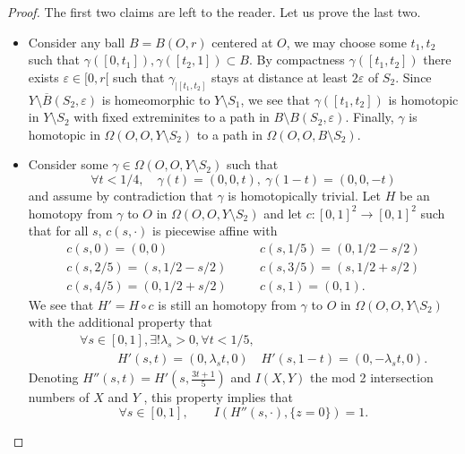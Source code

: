 \begin{proof}
The first two claims are left to the reader. Let us prove the last two.
 \begin{itemize}
\item 
 Consider any ball $B=B(O,r)$ centered at $O$, we may choose some $t_1,t_2$ such that $\gamma([0,t_1]),\gamma([t_2,1])  \subset B$. By compactness $\gamma([t_1,t_2])$ there exists  $\varepsilon\in [0,r[$ such that $\gamma_{|[t_1,t_2]}$ stays  at distance at least $2\varepsilon$ of $S_2$.  Since $Y\setminus \overline{B}(S_2,\varepsilon)$ is homeomorphic to $Y\setminus S_1$, we see that $\gamma([t_1,t_2])$ is homotopic in $Y\setminus S_2$ with fixed extreminites to a path in $B\setminus B(S_2,\varepsilon)$. Finally, $\gamma$ is homotopic in $\Omega(O,O,Y\setminus S_2)$ to a path  in $\Omega(O,O,B\setminus S_2)$. 

 \item Consider some $\gamma \in \Omega(O,O,Y\setminus S_2)$ such that
 $$\forall t< 1/4,\quad  \gamma(t) = (0,0,t),~ \gamma(1-t) = (0,0,-t) $$
 and assume by contradiction that $\gamma$ is homotopically trivial.   
  Let $H$ be an homotopy from $\gamma$ to $O$ in $\Omega(O,O,Y\setminus S_2)$ and let $c : [0,1]^2 \rightarrow [0,1]^2$ such that for all $s$, $c(s,\cdot)$ is piecewise affine with 
 \begin{eqnarray*}
c(s,0)=  (0,0)  &\quad&
c(s,1/5)=  (0,1/2-s/2)  \\
c(s,2/5)=  (s,1/2-s/2)  &\quad&
c(s,3/5)=  (s,1/2+s/2)  \\
c(s,4/5)=  (0,1/2+s/2 )  &\quad&
c(s,1)=  (0,1).  
\end{eqnarray*}
We see that $H'=H\circ c$ is still an homotopy from $\gamma$ to $O$ in $\Omega(O,O,Y\setminus S_2)$  with the additional property that 
\begin{eqnarray*} &&\forall s \in [0,1],  \exists! \lambda_s>0, \forall t<1/5, \\ 
&&\quad \quad \quad H'(s,t) = (0,\lambda_s t,0)\quad H'(s,1-t) = (0,-\lambda_s t,0).  \end{eqnarray*}
Denoting $H''(s,t) = H'(s,\frac{3t + 1}{5})$ and  $I(X,Y)$ the mod 2 intersection  numbers of $X$ and $Y$  \cite{MR2680546},  this property implies that 
$$ \forall s \in [0,1], \quad \quad
I(H''(s,\cdot),\{z=0\}) = 1.$$
 

\end{itemize}
\end{proof}
